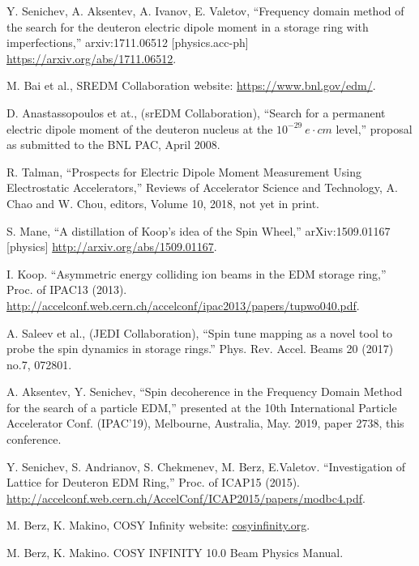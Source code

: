 \documentclass[a4paper]{jacow}
\begin{document}
\begin{thebibliography}{9}

  Y. Senichev, A. Aksentev, A. Ivanov, E. Valetov, ``Frequency domain method of the search for
  the deuteron electric dipole moment in a storage ring with imperfections,'' arxiv:1711.06512 [physics.acc-ph]
  \url{https://arxiv.org/abs/1711.06512}.

  M. Bai et al., SREDM Collaboration website: \url{https://www.bnl.gov/edm/}.

  D. Anastassopoulos et at., (srEDM Collaboration), ``Search for a permanent electric dipole moment of
  the deuteron nucleus at the $10^{-29}~e\cdot cm$ level,'' proposal as submitted to the BNL PAC, April 2008.

  R. Talman, ``Prospects for Electric Dipole Moment Measurement Using Electrostatic Accelerators,''
  Reviews of Accelerator Science and Technology, A. Chao and W. Chou, editors, Volume 10, 2018, not yet in print.

  S. Mane, ``A distillation of Koop's idea of the Spin Wheel,'' arXiv:1509.01167 [physics]
  \url{http://arxiv.org/abs/1509.01167}.

  I. Koop. ``Asymmetric energy colliding ion beams in the EDM storage ring,'' Proc. of IPAC13 (2013).
  \url{http://accelconf.web.cern.ch/accelconf/ipac2013/papers/tupwo040.pdf}.

  A. Saleev et al., (JEDI Collaboration), ``Spin tune mapping as a novel tool to probe
  the spin dynamics in storage rings.'' Phys. Rev. Accel. Beams 20 (2017) no.7, 072801.

  A. Aksentev, Y. Senichev, ``Spin decoherence in the Frequency Domain Method for the search of a particle EDM,''
  presented at the 10th International Particle Accelerator Conf. (IPAC’19), Melbourne, Australia,
  May. 2019, paper 2738, this conference.

  Y. Senichev, S. Andrianov, S. Chekmenev, M. Berz, E.Valetov. ``Investigation of Lattice for Deuteron EDM Ring,''
  Proc. of ICAP15 (2015). \url{http://accelconf.web.cern.ch/AccelConf/ICAP2015/papers/modbc4.pdf}.

  M. Berz, K. Makino, COSY Infinity website: \url{cosyinfinity.org}.

  M. Berz, K. Makino. COSY INFINITY 10.0 Beam Physics Manual.

\end{thebibliography} 
\end{document}
